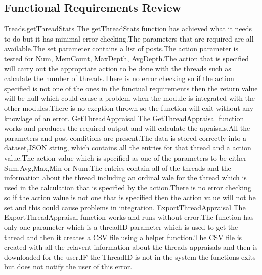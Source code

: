 \subsection{Functional Requirements Review}
Treads.getThreadStats
The getThreadStats function has achieved what it needs to do but it has minimal error checking.The parameters that are required are all available.The set parameter contains a list of posts.The action parameter is tested for Num, MemCount, MaxDepth, AvgDepth.The action that is specified will carry out the appropriate action to be done with the threads such as calculate the number of threads.There is no error checking so if the action specified is not one of the ones in the functual requirements then the return value will be null which could cause a problem when the module is integrated with the other modules.There is no exeption thrown so the function will exit without any knowlage of an error.
GetThreadAppraisal
The GetThreadAppraisal function works and produces the required output and will calculate the apraisals.All the parameters and post conditions are present.The data is stored correctly into a dataset,JSON string, which contains all the entries for that thread and a action value.The action value which is specified as one of the parameters to be either Sum,Avg,Max,Min or Num.The entries contain all of the threads and the information about the thread including an ordinal vale for the thread which is used in the calculation that is specified by the action.There is no error checking so if the action value is not one that is specified then the action value will not be set and this could cause problems in integration.
ExportThreadAppraisal
The ExportThreadAppraisal function works and runs without error.The function has only one parameter which is a threadID parameter which is used to get the thread and then it creates a CSV file using a helper function.The CSV file is created with all the relavent information about the threads appraisals and then is downloaded for the user.IF the ThreadID is not in the system the functions exits but does not notify the user of this error.